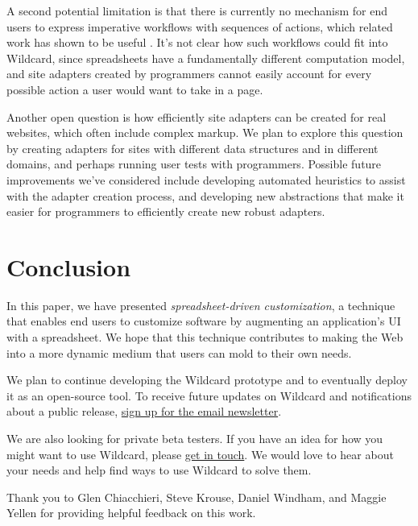 \documentclass[english,submission]{programming}
\begin{document}
A second potential limitation is that there is currently no mechanism
for end users to express imperative workflows with sequences of actions,
which related work has shown to be useful
\autocite{bolin2005,leshed2008}. It's not clear how such workflows could
fit into Wildcard, since spreadsheets have a fundamentally different
computation model, and site adapters created by programmers cannot
easily account for every possible action a user would want to take in a
page.

Another open question is how efficiently site adapters can be created
for real websites, which often include complex markup. We plan to
explore this question by creating adapters for sites with different data
structures and in different domains, and perhaps running user tests with
programmers. Possible future improvements we've considered include
developing automated heuristics to assist with the adapter creation
process, and developing new abstractions that make it easier for
programmers to efficiently create new robust adapters.

\hypertarget{conclusion}{%
\section{Conclusion}\label{conclusion}}

In this paper, we have presented \emph{spreadsheet-driven
customization}, a technique that enables end users to customize software
by augmenting an application's UI with a spreadsheet. We hope that this
technique contributes to making the Web into a more dynamic medium that
users can mold to their own needs.

We plan to continue developing the Wildcard prototype and to eventually
deploy it as an open-source tool. To receive future updates on Wildcard
and notifications about a public release, \href{}{sign up for the email
newsletter}.

We are also looking for private beta testers. If you have an idea for
how you might want to use Wildcard, please
\href{mailto:glitt@mit.edu}{get in touch}. We would love to hear about
your needs and help find ways to use Wildcard to solve them.

\acks
Thank you to Glen Chiacchieri, Steve Krouse, Daniel Windham, and Maggie
Yellen for providing helpful feedback on this work.

\printbibliography
\end{document}
